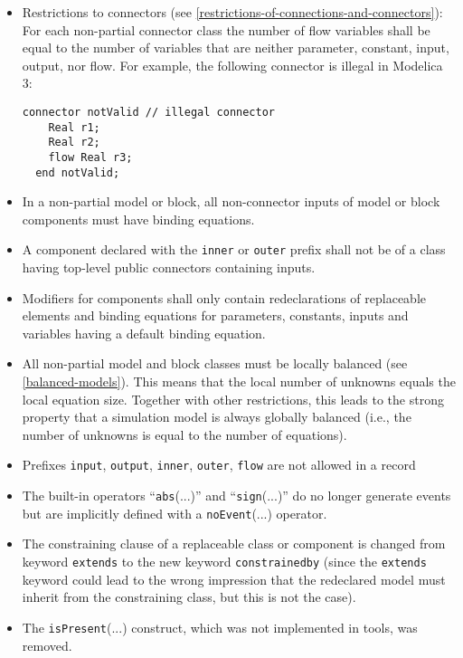 \begin{itemize}
\item
  Restrictions to connectors (see \autoref{restrictions-of-connections-and-connectors}): For each non-partial
  connector class the number of flow variables shall be equal to the
  number of variables that are neither parameter, constant, input,
  output, nor flow. For example, the following connector is illegal in
  Modelica 3:
  \begin{lstlisting}[language=modelica]
  connector notValid // illegal connector
    Real r1;
    Real r2;
    flow Real r3;
  end notValid;
  \end{lstlisting}
\item
  In a non-partial model or block, all non-connector inputs of model or
  block components must have binding equations.
\item
  A component declared with the \lstinline!inner! or \lstinline!outer! prefix shall not be of a
  class having top-level public connectors containing inputs.
\item
  Modifiers for components shall only contain redeclarations of
  replaceable elements and binding equations for parameters, constants,
  inputs and variables having a default binding equation.
\item
  All non-partial model and block classes must be locally balanced (see
  \autoref{balanced-models}). This means that the local number of unknowns equals the
  local equation size. Together with other restrictions, this leads to
  the strong property that a simulation model is always globally
  balanced (i.e., the number of unknowns is equal to the number of
  equations).
\item
  Prefixes \lstinline!input!, \lstinline!output!, \lstinline!inner!, \lstinline!outer!,
	\lstinline!flow! are not allowed in a record
\item
  The built-in operators ``\lstinline!abs!(...)'' and ``\lstinline!sign!(...)'' do no longer
  generate events but are implicitly defined with a \lstinline!noEvent!(...)
  operator.
\item
  The constraining clause of a replaceable class or component is changed
  from keyword \lstinline!extends! to the new keyword \lstinline!constrainedby! (since the
  \lstinline!extends! keyword could lead to the wrong impression that the redeclared
  model must inherit from the constraining class, but this is not the
  case).
\item
  The \lstinline!isPresent!(...) construct, which was not implemented in tools, was
  removed.
\end{itemize}

